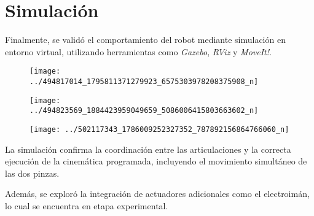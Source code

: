 \section{Simulación}

Finalmente, se validó el comportamiento del robot mediante simulación en entorno virtual, utilizando herramientas como \textit{Gazebo}, \textit{RViz} y \textit{MoveIt!}.

\begin{figure}
	\centering
	\texttt{[image: ../494817014\_1795811371279923\_6575303978208375908\_n]}
	\caption{}
	\label{fig:49481701417958113712799236575303978208375908n}
\end{figure}

\begin{figure}
	\centering
	\texttt{[image: ../494823569\_1884423959049659\_5086006415803663602\_n]}
	\caption{}
	\label{fig:49482356918844239590496595086006415803663602n}
\end{figure}

\begin{figure}
	\centering
	\texttt{[image: ../502117343\_1786009252327352\_787892156864766060\_n]}
	\caption{}
	\label{fig:5021173431786009252327352787892156864766060n}
\end{figure}


La simulación confirma la coordinación entre las articulaciones y la correcta ejecución de la cinemática programada, incluyendo el movimiento simultáneo de las dos pinzas.

Además, se exploró la integración de actuadores adicionales como el electroimán, lo cual se encuentra en etapa experimental.
